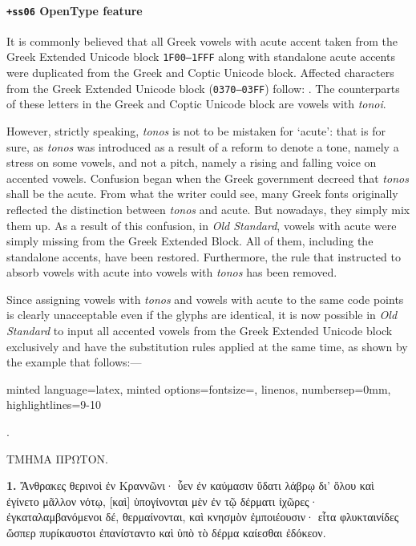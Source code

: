 \paragraph{\texttt{+ss06} OpenType feature} It is commonly believed
that all Greek vowels with acute accent taken from the Greek Extended
Unicode block \verb|1F00–1FFF| along with standalone acute accents
were duplicated from the Greek and Coptic Unicode block. Affected
characters from the Greek Extended Unicode block (\verb|0370–03FF|)
follow: . The counterparts of these letters in the Greek and Coptic
Unicode block are vowels with \emph{tonoi}.

However, strictly speaking, \emph{tonos} is not to be mistaken for
\enquote*{acute}: that is for sure, as \emph{tonos} was introduced as
a result of a reform to denote a tone, namely a stress on some vowels,
and not a pitch, namely a rising and falling voice on accented vowels.
Confusion began when the Greek government decreed that \emph{tonos}
shall be the acute.  From what the writer could see, many Greek fonts
originally reflected the distinction between \emph{tonos} and acute.
But nowadays, they simply mix them up.  As a result of this confusion,
in \emph{Old Standard}, vowels with acute were simply missing from the
Greek Extended Block. All of them, including the standalone accents,
have been restored. Furthermore, the rule that instructed to absorb
vowels with acute into vowels with \emph{tonos} has been removed.

Since assigning vowels with \emph{tonos} and vowels with acute to the
same code points is clearly unacceptable even if the glyphs are
identical, it is now possible in \emph{Old Standard} to input all
accented vowels from the Greek Extended Unicode block exclusively and
have the substitution rules applied at the same time, as shown by the
example that follows:---
\begin{tcblisting}{minted language=latex, minted
    options={fontsize=\smaller, linenos, numbersep=0mm,
      highlightlines={9-10}}}
  \begin{grc}
    \begin{center}
      .

      ΤΜΗΜΑ ΠΡΩΤΟΝ.
    \end{center}
    
    \textbf{1.} Ἄνθρακες θερινοὶ ἐν Κραννῶνι· ὗεν ἐν καύμασιν ὕδατι
    λάβρῳ δι’ ὅλου καὶ ἐγίνετο μᾶλλον νότῳ, [καὶ] ὑπογίνονται μὲν ἐν
    τῷ δέρματι ἰχῶρες· ἐγκαταλαμβανόμενοι δέ, θερμαίνονται, καὶ
    κνησμὸν ἐμποιέουσιν· εἶτα φλυκταινίδες ὥσπερ πυρίκαυστοι
    ἐπανίσταντο καὶ ὑπὸ τὸ δέρμα καίεσθαι ἐδόκεον.
  \end{grc}
\end{tcblisting}

